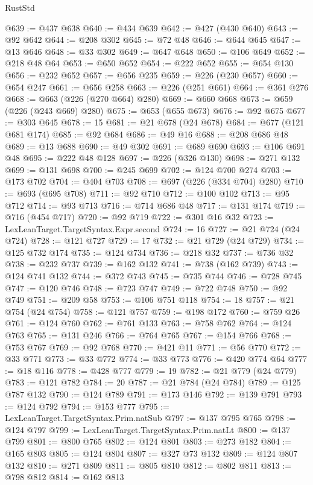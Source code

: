 \begin{lexlean}{RustStd}
\begin{coremodule}
@639 := @437 @638
@640 := @434 @639
@642 := @427 (@430 @640)
@643 := @92 @642
@644 := @208 @302
@645 := @72 @48
@646 := @644 @645
@647 := @13 @646
@648 := @33 @302
@649 := @647 @648
@650 := @106 @649
@652 := @218 @48 @64
@653 := @650 @652
@654 := @222 @652
@655 := @654 @130
@656 := @232 @652
@657 := @656 @235
@659 := @226 (@230 @657)
@660 := @654 @247
@661 := @656 @258
@663 := @226 (@251 @661)
@664 := @361 @276
@668 := @663 (@226 (@270 @664) @280)
@669 := @660 @668
@673 := @659 (@226 (@243 @669) @280)
@675 := @653 (@655 @673)
@676 := @92 @675
@677 := @303 @645
@678 := 15
@681 := @21 @678 (@24 @678)
@684 := @677 (@121 @681 @174)
@685 := @92 @684
@686 := @49 @16
@688 := @208 @686 @48
@689 := @13 @688
@690 := @49 @302
@691 := @689 @690
@693 := @106 @691 @48
@695 := @222 @48 @128
@697 := @226 (@326 @130)
@698 := @271 @132
@699 := @131 @698
@700 := @245 @699
@702 := @124 @700 @274
@703 := @173 @702
@704 := @404 @703
@708 := @697 (@226 (@334 @704) @280)
@710 := @693 (@695 @708)
@711 := @92 @710
@712 := @100 @102
@713 := @95 @712
@714 := @93 @713
@716 := @714 @686 @48
@717 := @131 @174
@719 := @716 (@454 @717)
@720 := @92 @719
@722 := @301 @16 @32
@723 := LexLeanTarget.TargetSyntax.Expr.second
@724 := 16
@727 := @21 @724 (@24 @724)
@728 := @121 @727
@729 := 17
@732 := @21 @729 (@24 @729)
@734 := @125 @732 @174
@735 := @124 @734
@736 := @218 @32
@737 := @736 @32
@738 := @232 @737
@739 := @162 @132
@741 := @738 (@162 @739)
@743 := @124 @741 @132
@744 := @372 @743
@745 := @735 @744
@746 := @728 @745
@747 := @120 @746
@748 := @723 @747
@749 := @722 @748
@750 := @92 @749
@751 := @209 @58
@753 := @106 @751 @118
@754 := 18
@757 := @21 @754 (@24 @754)
@758 := @121 @757
@759 := @198 @172
@760 := @759 @26
@761 := @124 @760
@762 := @761 @133
@763 := @758 @762
@764 := @124 @763
@765 := @131 @246
@766 := @764 @765
@767 := @154 @766
@768 := @753 @767
@769 := @92 @768
@770 := @421 @11
@771 := @56 @770
@772 := @33 @771
@773 := @33 @772
@774 := @33 @773
@776 := @420 @774 @64
@777 := @18 @116
@778 := @428 @777
@779 := 19
@782 := @21 @779 (@24 @779)
@783 := @121 @782
@784 := 20
@787 := @21 @784 (@24 @784)
@789 := @125 @787 @132
@790 := @124 @789
@791 := @173 @146
@792 := @139 @791
@793 := @124 @792
@794 := @153 @777
@795 := LexLeanTarget.TargetSyntax.Prim.natSub
@797 := @137 @795 @765
@798 := @124 @797
@799 := LexLeanTarget.TargetSyntax.Prim.natLt
@800 := @137 @799
@801 := @800 @765
@802 := @124 @801
@803 := @273 @182
@804 := @165 @803
@805 := @124 @804
@807 := @327 @73 @132
@809 := @124 @807 @132
@810 := @271 @809
@811 := @805 @810
@812 := @802 @811
@813 := @798 @812
@814 := @162 @813

\end{coremodule}
\end{lexlean}
